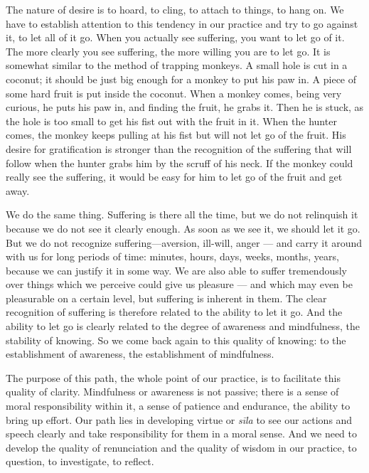 The nature of desire is to hoard, to cling, to attach to things, to hang
on. We have to establish attention to this tendency in our practice and
try to go against it, to let all of it go. When you actually see
suffering, you want to let go of it. The more clearly you see suffering,
the more willing you are to let go. It is somewhat similar to the method
of trapping monkeys. A small hole is cut in a coconut; it should be just
big enough for a monkey to put his paw in. A piece of some hard fruit is
put inside the coconut. When a monkey comes, being very curious, he puts
his paw in, and finding the fruit, he grabs it. Then he is stuck, as the
hole is too small to get his fist out with the fruit in it. When the
hunter comes, the monkey keeps pulling at his fist but will not let go
of the fruit. His desire for gratification is stronger than the
recognition of the suffering that will follow when the hunter grabs him
by the scruff of his neck. If the monkey could really see the suffering,
it would be easy for him to let go of the fruit and get away.

We do the same thing. Suffering is there all the time, but we do not
relinquish it because we do not see it clearly enough. As soon as we see
it, we should let it go. But we do not recognize suffering---aversion,
ill-will, anger --- and carry it around with us for long periods of
time: minutes, hours, days, weeks, months, years, because we can justify
it in some way. We are also able to suffer tremendously over things
which we perceive could give us pleasure --- and which may even be
pleasurable on a certain level, but suffering is inherent in them. The
clear recognition of suffering is therefore related to the ability to
let it go. And the ability to let go is clearly related to the degree of
awareness and mindfulness, the stability of knowing. So we come back
again to this quality of knowing: to the establishment of awareness, the
establishment of mindfulness.

The purpose of this path, the whole point of our practice, is to
facilitate this quality of clarity. Mindfulness or awareness is not
passive; there is a sense of moral responsibility within it, a sense of
patience and endurance, the ability to bring up effort. Our path lies in
developing virtue or \emph{sīla} to see our actions and speech clearly
and take responsibility for them in a moral sense. And we need to
develop the quality of renunciation and the quality of wisdom in our
practice, to question, to investigate, to reflect.

